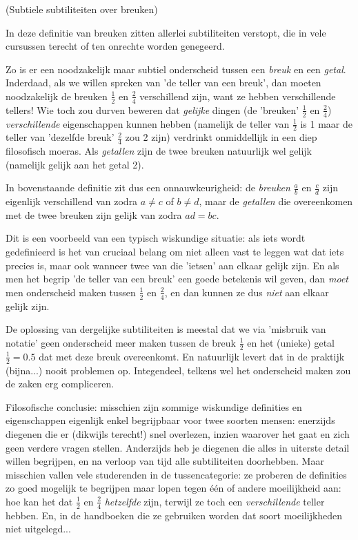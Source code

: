 \documentclass[numbers]{ximera}
\begin{document}
\begin{uitweiding} (Subtiele subtiliteiten over breuken)
\begin{expandable}

		In deze definitie van breuken zitten allerlei subtiliteiten verstopt, die in vele cursussen terecht of ten onrechte worden genegeerd. 
		
		Zo is er een noodzakelijk maar subtiel onderscheid tussen een \textit{breuk} en een \textit{getal}. Inderdaad, als we willen spreken van 'de teller van een breuk', dan moeten noodzakelijk de breuken $\frac 12$ en $\frac 24$ verschillend zijn, want ze hebben verschillende tellers! Wie toch zou durven beweren dat \textit{gelijke} dingen (de 'breuken' $\frac 12$ en $\frac 24$)  \textit{verschillende} eigenschappen kunnen hebben (namelijk de teller van $\frac 12$ is 1 maar de teller van 'dezelfde breuk' $\frac24$ zou 2 zijn) verdrinkt onmiddellijk in een diep filosofisch moeras. Als \textit{getallen} zijn de twee breuken natuurlijk wel gelijk (namelijk gelijk aan het getal 2).
		
		In bovenstaande definitie zit dus een onnauwkeurigheid: de \textit{breuken} $\frac ab$ en $\frac cd$ zijn eigenlijk verschillend van zodra $a\neq c$ of $b\neq d$, maar de \textit{getallen} die overeenkomen met de twee breuken zijn gelijk van zodra $ad = bc$.
		
		Dit is een voorbeeld van een typisch wiskundige situatie: als iets wordt gedefinieerd is het van cruciaal belang om niet alleen vast te leggen wat dat iets precies is, maar ook wanneer twee van die 'ietsen' aan elkaar gelijk zijn. En als men het begrip 'de teller van een breuk' een goede betekenis wil geven, dan \textit{moet} men onderscheid maken tussen $\frac 12$ en $\frac 24$, en dan kunnen ze dus \textit{niet} aan elkaar gelijk zijn. 
		
		De oplossing van dergelijke subtiliteiten is meestal dat we via 'misbruik van notatie' geen onderscheid meer maken tussen de breuk $\frac 12$ en het (unieke) getal $\frac 12 = 0.5$ dat met deze breuk overeenkomt. En natuurlijk levert dat in de praktijk (bijna...) nooit problemen op. Integendeel, telkens wel het onderscheid maken zou de zaken erg compliceren. 
		
		Filosofische conclusie: misschien zijn sommige wiskundige definities en eigenschappen eigenlijk enkel begrijpbaar voor twee soorten mensen: enerzijds diegenen die er (dikwijls terecht!) snel overlezen, inzien waarover het gaat en zich geen verdere vragen stellen. Anderzijds heb je diegenen die alles in uiterste detail willen begrijpen, en na verloop van tijd alle subtiliteiten doorhebben. Maar misschien vallen vele studerenden in de tussencategorie: ze proberen de definities zo goed mogelijk te begrijpen maar lopen tegen één of andere moeilijkheid aan: hoe kan het dat $\frac 12$ en $\frac 24$ \textit{hetzelfde} zijn, terwijl ze toch een \textit{verschillende} teller hebben. En, in de handboeken die ze gebruiken worden dat soort moeilijkheden niet uitgelegd...
\end{expandable}
\end{uitweiding}
\end{document}

